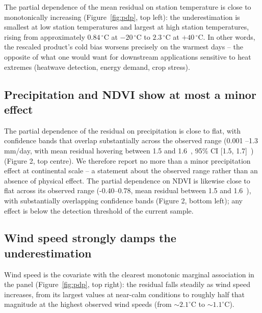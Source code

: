 \documentclass[a4paper,12pt,leqno]{article}
\begin{document}
The partial dependence of the mean residual on station temperature is
close to monotonically increasing (Figure~\ref{fig:pdp}, top left): the
underestimation is smallest at low station temperatures and largest at
high station temperatures, rising from approximately $0.84\,^\circ$C at
$-20\,^\circ$C to $2.3\,^\circ$C at $+40\,^\circ$C. In other words, the
rescaled product's cold bias worsens precisely on the warmest days --
the opposite of what one would want for downstream applications
sensitive to heat extremes (heatwave detection, energy demand, crop
stress).

\subsection{Precipitation and NDVI show at most a minor effect}
\label{sec:results-precip}

The partial dependence of the residual on precipitation is close to flat, with confidence
bands that overlap substantially across the observed range (0.001
–1.3 mm/day, with mean residual hovering between 1.5 and 1.6~, 95\% CI [1.5, 1.7]~) (Figure 2, top centre). We therefore report no more than a minor precipitation effect at
continental scale – a statement about the observed range rather than an absence of
physical effect. The partial dependence on NDVI is likewise close to flat across its observed range (-0.40–0.78, mean residual between 1.5 and 1.6~), with substantially overlapping confidence bands (Figure 2, bottom left);
any effect is below the detection threshold of the current sample.

\subsection{Wind speed strongly damps the underestimation}
\label{sec:results-wind}

Wind speed is the covariate with the clearest monotonic marginal
association in the panel (Figure~\ref{fig:pdp}, top right): the residual
falls steadily as wind speed increases, from its largest values at
near-calm conditions to roughly half that magnitude at the highest
observed wind speeds (from $\sim 2.1^\circ$C to $\sim 1.1^\circ$C).
\end{document}

